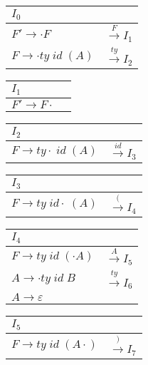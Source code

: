 \documentclass[11pt]{article}
\begin{document}
\begin{multicols}{2}

\begin{table}[H]
\centering
\begin{tabular}{ l c }
$I_{0}$ & \\
\hline
$F' \rightarrow \cdot F$ & $\xrightarrow{F} I_{1}$ \\
$F \rightarrow \cdot ty \; id \; \left( A\right)$ & $\xrightarrow{ty} I_{2}$ \\
\end{tabular}
\end{table}

\begin{table}[H]
\centering
\begin{tabular}{l c}
$I_{1}$ & \\
\hline
$F' \rightarrow F \cdot$ \\
\end{tabular}
\end{table}

\begin{table}[H]
\centering
\begin{tabular}{l c}
$I_{2}$ & \\
\hline
$F \rightarrow ty \cdot \; id \; \left( A\right)$ & $\xrightarrow{id} I_{3}$    
\end{tabular}
\end{table}

\begin{table}[H]
  \centering
  \begin{tabular}{l c}
    $I_{3}$ & \\
\hline
$F \rightarrow ty \; id \cdot \; \left( A\right)$ & $\xrightarrow{(} I_{4}$
  \end{tabular}
\end{table}

\begin{table}[H]
\centering
\begin{tabular}{l c}
$I_{4}$ & \\
\hline
$F \rightarrow ty \; id \; \left( \cdot A\right)$ & $\xrightarrow{A} I_{5}$ \\
$A \rightarrow \cdot ty \; id \; B$ & $\xrightarrow{ty} I_{6}$ \\
$A \rightarrow \varepsilon$    
\end{tabular}
\end{table}

\begin{table}[H]
\centering
\begin{tabular}{l c}
$I_{5}$ & \\
\hline
$F \rightarrow ty \; id \; \left( A \cdot \right)$ & $\xrightarrow{)} I_{7}$    
\end{tabular}
\end{table}


\end{multicols}
\end{document}
